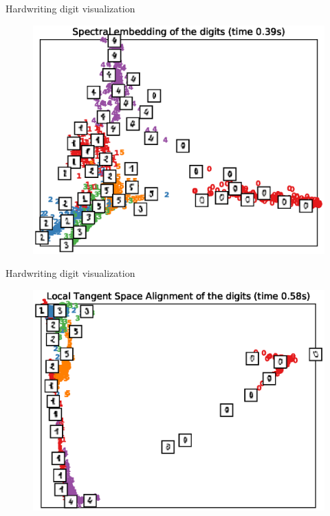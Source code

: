 \documentclass[10pt]{beamer}
\begin{document}
\begin{frame}{Hardwriting digit visualization}
\begin{figure}
\centering
\includegraphics[scale=0.65]{./image/experiment/le.eps}
\end{figure}
\end{frame}

\begin{frame}{Hardwriting digit visualization}
\begin{figure}
\centering
\includegraphics[scale=0.65]{./image/experiment/ltsa.eps}
\end{figure}
\end{frame}
\end{document}
